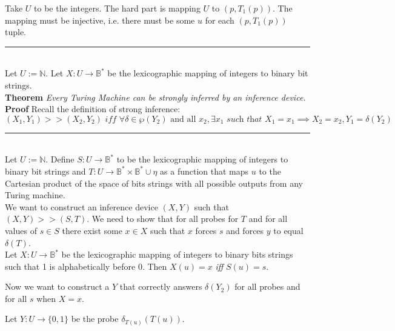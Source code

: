 \documentclass[11pt]{article}
\newcommand{\N}{\mathbb{N}}
\newcommand{\B}{\mathbb{B}}
\begin{document}
Take $ U $ to be the integers. The hard part is mapping $ U $ to $ (p, T_{1}(p)) $. The mapping must be injective, i.e. there must be some $ u $ for each $(p, T_{1}(p))$ tuple. \\



\noindent\rule{16cm}{0.4pt} \\
Let $ U := \N $. Let $ X: U \rightarrow \B^{*} $ be the lexicographic mapping of integers to binary bit strings. \\


\textbf{Theorem} \quad \textit{Every Turing Machine can be strongly inferred by an inference device.} \\
\textbf{Proof} \quad Recall the definition of strong inference:
$$ (X_1, Y_1) >> (X_2, Y_2) \textit{ iff } \forall \delta \in \wp(Y_2)\text{ and all } x_2,  \exists x_1 \textit{ such that } X_1 = x_1 \implies X_2 = x_2, Y_1 = \delta(Y_2) $$

\noindent\rule{16cm}{0.4pt} \\
Let $ U := \N $. Define $ S: U \rightarrow \B^{*} $ to be the lexicographic mapping of integers to binary bit strings and $ T: U \rightarrow \B^{*} \times \B^{*} \cup \eta$ as a function that maps $u$ to the Cartesian product of the space of bits strings with all possible outputs from any Turing machine. \\

We want to construct an inference device $ (X, Y) $ such that $(X, Y) >> (S, T) $. We need to show that for all probes for $ T $ and for all values of $ s \in S $ there exist some $ x \in X $ such that $ x $ forces $ s $ and forces $ y $ to equal $ \delta(T) $. \\

Let $ X : U \rightarrow \B^{*} $ be the lexicographic mapping of integers to binary bits strings such that 1 is alphabetically before 0. Then $ X(u) = x $ \textit{ iff } $S(u) = s $. 

Now we want to construct a $ Y $ that correctly answers $ \delta(Y_2) $ for all probes and for all $ s $ when $ X = x $. 

Let $ Y : U \rightarrow \{0, 1\} $ be the probe $ \delta_{T(u)}(T(u)) $. 








% 
\end{document}
